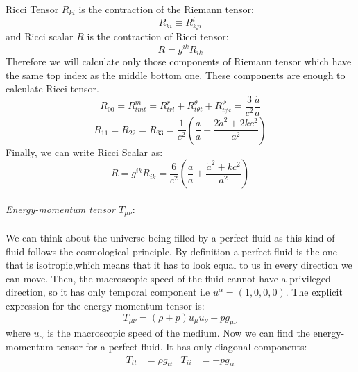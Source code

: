 \documentclass[14pt]{extarticle}
\begin{document}
Ricci Tensor $R_{k i}$ is the contraction of the Riemann tensor:\\
\begin{equation}
R_{k i} \equiv R_{k j i}^{l}
\end{equation}
and Ricci scalar $R$ is the contraction of Ricci tensor:\\
\begin{equation}
R=g^{i k} R_{i k}
\end{equation} 
Therefore we will calculate only those components of Riemann tensor which have the same top index as the middle bottom one. These components are enough to calculate Ricci tensor.\\
\begin{equation}
R_{0 0}=R_{t m t}^{m}=R_{t r l}^{r}+R_{t \theta t}^{\theta}+R_{t \phi t}^{\phi}= \frac{3}{c^{2}} \frac{\ddot{a}}{a}
\end{equation}
\begin{equation}
R_{1 1}=R_{2 2}=R_{3 3}=\frac{1}{c^{2}}\left(\frac{\ddot{a}}{a}+\frac{2 \dot{a}^{2}+2 k c^{2}}{a^{2}}\right)
\end{equation}
Finally, we can write Ricci Scalar as:\\
\begin{equation}
R=g^{i k} R_{i k} = \frac{6}{c^{2}}\left(\frac{\ddot{a}}{a}+\frac{\dot{a}^{2}+k c^{2}}{a^{2}}\right)
\end{equation} \\
\textit{Energy-momentum tensor $T_{\mu \nu}$}:\\ \\
We can think about the universe being filled by a perfect fluid as this kind of fluid follows the cosmological principle. By definition a perfect fluid is the one that is isotropic,which  means  that  it  has  to  look  equal  to  us  in  every direction we can move.  Then, the macroscopic speed of the fluid cannot have a privileged direction, so it has only temporal component i.e $u^{\alpha}=(1,0,0,0)$. The explicit expression for the energy momentum tensor is:\\
\begin{equation}
T_{\mu \nu}=(\rho+p) u_{\mu} u_{\nu}-p g_{\mu \nu}
\end{equation}
where $u_{\alpha}$ is the macroscopic speed of the medium. Now we can find the energy-momentum tensor for a perfect fluid. It has only diagonal components:\\
\begin{align*}
T_{t t}&=\rho g_{t t} &  T_{i i}&=-p g_{i i}
\end{align*}
\end{document}
